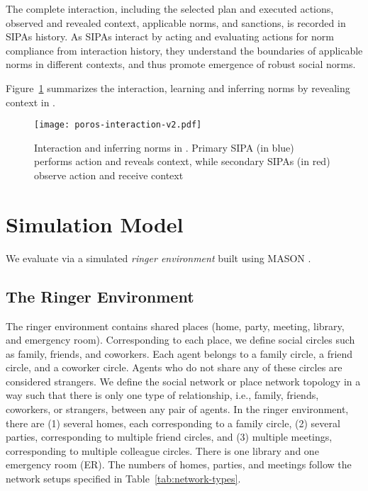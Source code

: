 The complete interaction, including the selected plan and executed actions, observed and revealed context, applicable norms, and sanctions, is recorded in SIPAs history. 
As SIPAs interact by acting and evaluating actions for norm compliance from interaction history, they understand the boundaries of applicable norms in different contexts, and thus promote emergence of robust social norms. 

Figure~\ref{fig:poros-interaction} summarizes the interaction, learning and inferring norms by revealing context in \frameworkB. 

\begin{figure}[!htb]
    \centering
    \texttt{[image: poros-interaction-v2.pdf]}
    \caption[Interaction and inferring norms in \frameworkB]{Interaction and inferring norms in \frameworkB. Primary SIPA (in blue) performs action and reveals context, while secondary SIPAs (in red) observe action and receive context}
    \label{fig:poros-interaction}
\end{figure}

\section{Simulation Model}
\label{sec:Poros-simulation-model}

We evaluate \frameworkB via a simulated 
\emph{ringer environment} built using MASON \citep{Luke-2005-Mason}.

\subsection{The Ringer Environment}
The ringer environment contains shared places (home, party, meeting, library, and emergency room).
Corresponding to each place, we define social circles such as family, friends, and coworkers. Each agent belongs to a family circle, a friend circle, and a coworker circle. Agents who do not share any of these circles are considered strangers. We define the social network or place network topology in a way such that there is only one type of relationship, i.e., family, friends, coworkers, or strangers, between any pair of agents. 
In the ringer environment, there are (1) several homes, each corresponding to a family circle, (2) several parties, corresponding to multiple friend circles, and (3) multiple meetings, corresponding to multiple colleague circles. There is one library and one emergency room (ER). The numbers of homes, parties, and meetings follow the network setups specified in Table~\ref{tab:network-types}.

